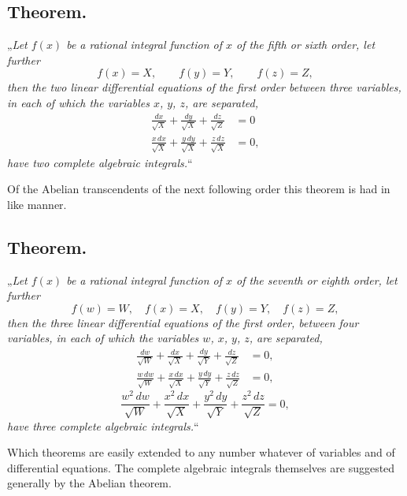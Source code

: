 \documentclass{article}
\begin{document}
\subsection*{Theorem.}

„\emph{Let $f(x)$ be a rational integral function of $x$ of the fifth or sixth order, let further}
\[ f(x) = X, \qquad f(y) = Y, \qquad f(z) = Z, \]
\emph{then the two linear differential equations of the first order between three variables, in each of which the variables $x$, $y$, $z$, are separated,}
\[ \begin{aligned} \frac{dx}{\sqrt{X}} + \frac{dy}{\sqrt{X}} + \frac{dz}{\sqrt{Z}} &= 0 \\ \frac{x\,dx}{\sqrt{X}} + \frac{y\,dy}{\sqrt{X}} + \frac{z\,dz}{\sqrt{X}} &= 0, \end{aligned} \]
\emph{have two complete algebraic integrals.}“

Of the Abelian transcendents of the next following order this theorem is had in like manner.

\subsection*{Theorem.}

„\emph{Let $f(x)$ be a rational integral function of $x$ of the seventh or eighth order, let further}
\[ f(w) = W, \quad f(x) = X, \quad f(y) = Y, \quad f(z) = Z, \]
\emph{then the three linear differential equations of the first order, between four variables, in each of which the variables $w$, $x$, $y$, $z$, are separated,}
\[ \begin{aligned} \frac{dw}{\sqrt{W}} + \frac{dx}{\sqrt{X}} + \frac{dy}{\sqrt{Y}} + \frac{dz}{\sqrt{Z}} &= 0, \\ \frac{w\,dw}{\sqrt{W}} + \frac{x\,dx}{\sqrt{X}} + \frac{y\,dy}{\sqrt{Y}} + \frac{z\,dz}{\sqrt{Z}} &= 0, \end{aligned} \]
\[ \frac{w^{2}\,dw}{\sqrt{W}} + \frac{x^{2}\,dx}{\sqrt{X}} + \frac{y^{2}\,dy}{\sqrt{Y}} + \frac{z^{2}\,dz}{\sqrt{Z}} = 0, \]
\emph{have three complete algebraic integrals.}“

Which theorems are easily extended to any number whatever of variables and of differential equations. The complete algebraic integrals themselves are suggested generally by the Abelian theorem.
\end{document}
